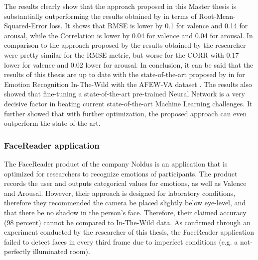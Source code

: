 The results clearly show that the approach proposed in this Master thesis is substantially outperforming the results obtained by \citet{Kossaifi:2017:AFEW-VADatabase} in terms of Root-Mean-Squared-Error loss. It shows that RMSE is lower by 0.1 for valence and 0.14 for arousal, while the Correlation is lower by 0.04 for valence and 0.04 for arousal. In comparison to the approach proposed by \citet{Handrich:2020:SimultaneousPredVA} the results obtained by the researcher were pretty similar for the RMSE metric, but worse for the CORR with 0.17 lower for valence and 0.02 lower for arousal.
\newline\newline
In conclusion, it can be said that the results of this thesis are up to date with the state-of-the-art proposed by \citet{Handrich:2020:SimultaneousPredVA} in \citeyear{Handrich:2020:SimultaneousPredVA} for Emotion Recognition In-The-Wild with the AFEW-VA dataset \citep{Kossaifi:2017:AFEW-VADatabase}. The results also showed that fine-tuning a state-of-the-art pre-trained Neural Network is a very decisive factor in beating current state-of-the-art Machine Learning challenges. It further showed that with further optimization, the proposed approach can even outperform the state-of-the-art.

\subsubsection{FaceReader application}
The FaceReader product of the company Noldus \citep{Noldus:2020:Facereader} is an application that is optimized for researchers to recognize emotions of participants. The product records the user and outputs categorical values for emotions, as well as Valence and Arousal. However, their approach is designed for laboratory conditions, therefore they recommended the camera be placed slightly below eye-level, and that there be no shadow in the person's face. Therefore, their claimed accuracy (98 percent) cannot be compared to In-The-Wild data. As confirmed through an experiment conducted by the researcher of this thesis, the FaceReader application failed to detect faces in every third frame due to imperfect conditions (e.g. a not-perfectly illuminated room).


